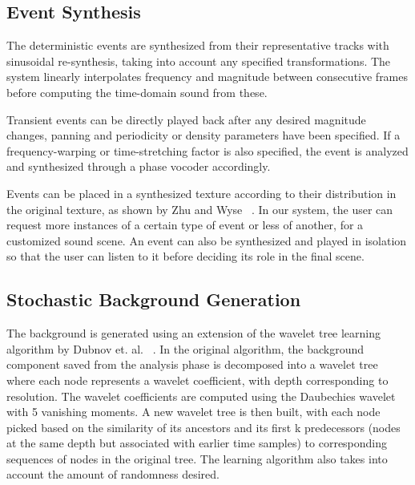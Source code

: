 \documentclass[review]{acmsiggraph}      %
\begin{document}
\subsection{Event Synthesis}

The deterministic events are synthesized from their representative tracks with 
sinusoidal re-synthesis, taking into account any specified transformations. 
The system linearly interpolates frequency and magnitude 
between consecutive frames before computing the time-domain sound from 
these. 

Transient events can be directly played back after any 
desired magnitude changes, panning and periodicity or density parameters 
have been specified. If a frequency-warping or time-stretching factor is also specified, the 
event is analyzed and synthesized through a phase vocoder accordingly.

Events can be placed in a synthesized texture according to their 
distribution in the original texture, as shown by Zhu and Wyse 
~. In our system, the user can request more instances of a 
certain type of event or less of another, for a customized sound scene. 
An event can also be 
synthesized and played in isolation so that the user can listen to it 
before deciding its role in the final scene.


\subsection{Stochastic Background Generation}

The background is generated using an extension of the wavelet tree 
learning algorithm by Dubnov et. al. ~. In the original 
algorithm, the background component saved from the analysis phase is 
decomposed into a wavelet tree where each node represents a wavelet 
coefficient, with depth corresponding to resolution.  The wavelet 
coefficients are computed using the Daubechies wavelet with 5 vanishing 
moments. A new wavelet tree is then built, with each node picked 
based on the similarity of its ancestors and its first k predecessors 
(nodes at the same depth but associated with earlier time samples) to 
corresponding sequences of nodes in the 
original tree. The learning algorithm also takes into account the amount of 
randomness desired.
\end{document}
